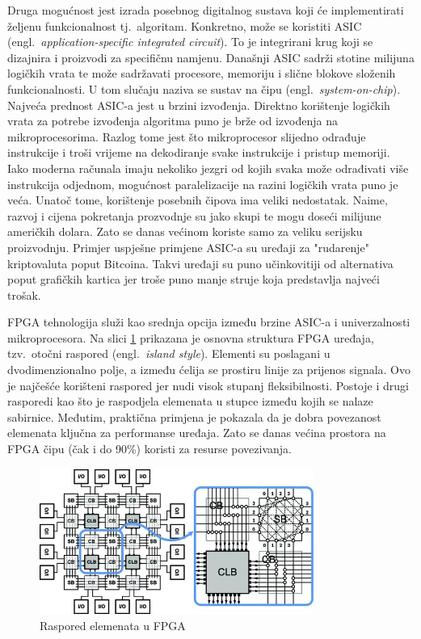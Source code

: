 \documentclass[times, utf8, diplomski]{fer}
\begin{document}
Druga mogućnost jest izrada posebnog digitalnog sustava koji će implementirati željenu funkcionalnost tj.~algoritam. Konkretno, može se koristiti ASIC (engl.~\textit{application-specific integrated circuit}). To je integrirani krug koji se dizajnira i proizvodi za specifičnu namjenu. Današnji ASIC sadrži stotine milijuna logičkih vrata te može sadržavati procesore, memoriju i slične blokove složenih funkcionalnosti. U tom slučaju naziva se sustav na čipu (engl.~\textit{system-on-chip}). Najveća prednost ASIC-a jest u brzini izvođenja. Direktno korištenje logičkih vrata za potrebe izvođenja algoritma puno je brže od izvođenja na mikroprocesorima. Razlog tome jest što mikroprocesor slijedno odrađuje instrukcije i troši vrijeme na dekodiranje svake instrukcije i pristup memoriji. Iako moderna računala imaju nekoliko jezgri od kojih svaka može odrađivati više instrukcija odjednom, mogućnost paralelizacije na razini logičkih vrata puno je veća. Unatoč tome, korištenje posebnih čipova ima veliki nedostatak. Naime, razvoj i cijena pokretanja prozvodnje su jako skupi te mogu doseći milijune američkih dolara. Zato se danas većinom koriste samo za veliku serijsku proizvodnju. Primjer uspješne primjene ASIC-a su uređaji za "rudarenje" kriptovaluta poput Bitcoina. Takvi uređaji su puno učinkovitiji od alternativa poput grafičkih kartica jer troše puno manje struje koja predstavlja najveći trošak.

FPGA tehnologija služi kao srednja opcija između brzine ASIC-a i univerzalnosti mikroprocesora. Na slici \ref{fig:fpga_island} prikazana je osnovna struktura FPGA uređaja, tzv.~otočni raspored (engl.~\textit{island style}). Elementi su poslagani u dvodimenzionalno polje, a između ćelija se prostiru linije za prijenos signala. Ovo je najčešće korišteni raspored jer nudi visok stupanj fleksibilnosti. Postoje i drugi rasporedi kao što je raspodjela elemenata u stupce između kojih se nalaze sabirnice. Međutim, praktična primjena je pokazala da je dobra povezanost elemenata ključna za performanse uređaja. Zato se danas većina prostora na FPGA čipu (čak i do 90\%) koristi za resurse povezivanja.

\begin{figure}[htb]
	\centering
	\includegraphics[width=0.8\textwidth]{img/fpga_island_notext.jpg}
	\caption{Raspored elemenata u FPGA}
	\label{fig:fpga_island}
\end{figure}
\end{document}
